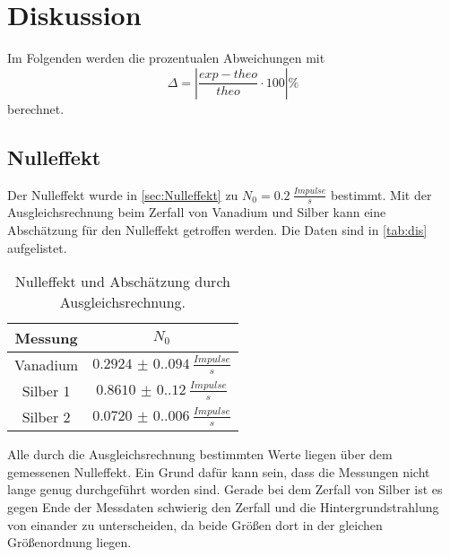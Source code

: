 \section{Diskussion}
\label{sec:Diskussion}
Im Folgenden werden die prozentualen Abweichungen mit 
\begin{equation}\label{eq:1}
    \Delta = |\frac{exp - theo}{theo} \cdot 100|\%
\end{equation}
berechnet.
\subsection{Nulleffekt}
Der Nulleffekt wurde in \autoref{sec:Nulleffekt} zu $N_0 = \SI{0.2}{\frac{Impulse}{s}}$ bestimmt. 
Mit der Ausgleichsrechnung beim Zerfall von Vanadium und Silber kann eine Abschätzung für den Nulleffekt getroffen werden. Die Daten sind in \autoref{tab:dis} 
aufgelistet.

\begin{table}[H]
    \centering
    \caption{Nulleffekt und Abschätzung durch Ausgleichsrechnung.}
    \begin{tabular}{c c}
        \toprule
        {Messung} & {$N_0$}\\
        \midrule
        Vanadium & $\SI{0.2924(0.094)}{\frac{Impulse}{s}}$\\
        Silber 1 & $\SI{0.8610(0.120)}{\frac{Impulse}{s}}$\\
        Silber 2 & $\SI{0.0720(0.006)}{\frac{Impulse}{s}}$\\
        \bottomrule
    \end{tabular}
    \label{tab:dis}
\end{table}

Alle durch die Ausgleichsrechnung bestimmten Werte liegen über dem gemessenen Nulleffekt.
Ein Grund dafür kann sein, dass die Messungen nicht lange genug durchgeführt worden sind. Gerade bei dem Zerfall von Silber ist es gegen Ende 
der Messdaten schwierig den Zerfall und die Hintergrundstrahlung von einander zu unterscheiden, da beide Größen dort 
in der gleichen Größenordnung liegen.

